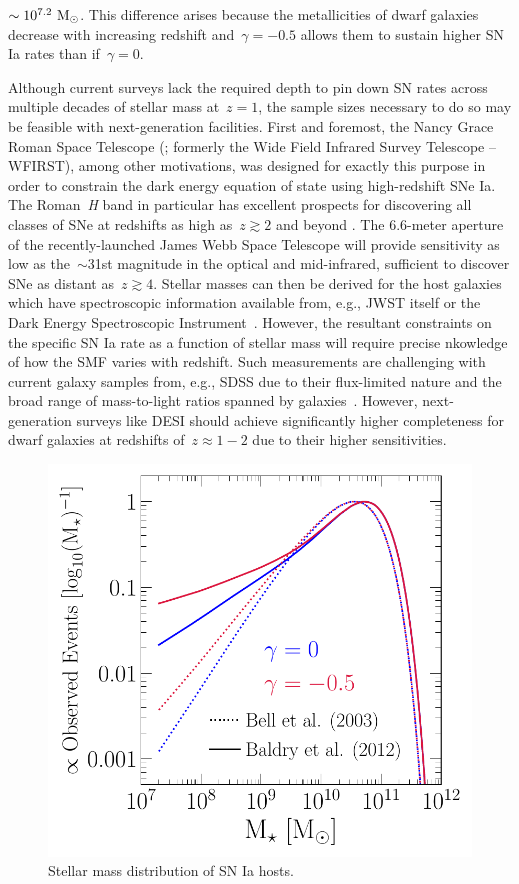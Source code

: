 \documentclass[ms.tex]{subfiles}
\begin{document}
$\sim 10^{7.2}~\text{M}_\odot$.
This difference arises because the metallicities of dwarf galaxies decrease
with increasing redshift and~$\gamma = -0.5$ allows them to sustain higher
SN Ia rates than if~$\gamma = 0$.
\par
Although current surveys lack the required depth to pin down SN rates across
multiple decades of stellar mass at~$z = 1$, the sample sizes necessary to do
so may be feasible with next-generation facilities.
First and foremost, the Nancy Grace Roman Space Telescope (\citealp{Spergel2013,
Spergel2015}; formerly the Wide Field Infrared Survey Telescope -- WFIRST),
among other motivations, was designed for exactly this purpose in order to
constrain the dark energy equation of state using high-redshift SNe Ia.
The Roman~\textit{H} band in particular has excellent prospects for discovering
all classes of SNe at redshifts as high as~$z \gtrsim 2$ and beyond
\citep{Petrushevska2016}.
The 6.6-meter aperture of the recently-launched James Webb Space Telescope
\citep[JWST;][]{Gardner2006} will provide sensitivity as low as the~$\sim$31st
magnitude in the optical and mid-infrared, sufficient to discover SNe as
distant as~$z \gtrsim 4$.
Stellar masses can then be derived for the host galaxies which have
spectroscopic information available from, e.g., JWST itself or the Dark Energy
Spectroscopic Instrument~\citep[DESI;][]{Desi2016}.
However, the resultant constraints on the specific SN Ia rate as a function of
stellar mass will require precise nkowledge of how the SMF varies with redshift.
Such measurements are challenging with current galaxy samples from, e.g.,
SDSS due to their flux-limited nature and the broad range of mass-to-light
ratios spanned by galaxies~\citep*{Weigel2016}.
However, next-generation surveys like DESI should achieve significantly higher
completeness for dwarf galaxies at redshifts of~$z \approx 1 - 2$ due to their
higher sensitivities.

\begin{figure}
\centering
\includegraphics[scale = 0.55]{ia_massdist.pdf}
\caption{
Stellar mass distribution of SN Ia hosts.
}
\label{fig:hostmassdist}
\end{figure}
\end{document}
